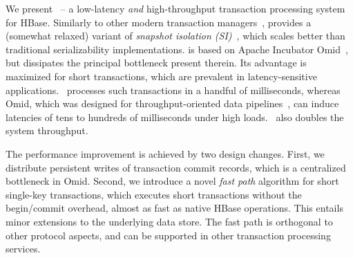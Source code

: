 We present {\sys\/}~-- a low-latency {\em and\/} high-throughput transaction processing system for HBase. 
Similarly to other modern transaction managers~\cite{Percolator2010,Spanner2012,Omid2017,tephra,cockroach},
{\sys\/} provides a (somewhat relaxed) variant of \emph{snapshot isolation (SI)}~\cite{DBLP:conf/sigmod/BerensonBGMOO95},
which scales better than traditional serializability implementations. 
{\sys\/} is based on Apache Incubator Omid~\cite{omid}, but dissipates the principal bottleneck present therein.
Its advantage is maximized for short  transactions, which are prevalent in latency-sensitive applications.
\sys\ processes  such transactions in a handful of milliseconds, whereas Omid, 
which was designed for throughput-oriented data pipelines~\cite{Omid2017}, 
can induce latencies of tens to hundreds of milliseconds under high loads. 
\sys\ also doubles the system throughput.

The performance improvement  is achieved by two design changes.
  First, we distribute persistent writes of transaction commit records, which is a centralized bottleneck in Omid. 
Second, we introduce a novel \emph{fast path} algorithm for short single-key transactions, which 
executes short transactions without the begin/commit overhead, 
 almost as fast as native HBase operations. This entails minor extensions to the underlying 
data store. The fast path is orthogonal to other protocol aspects, and can be supported in other 
transaction processing services. 


